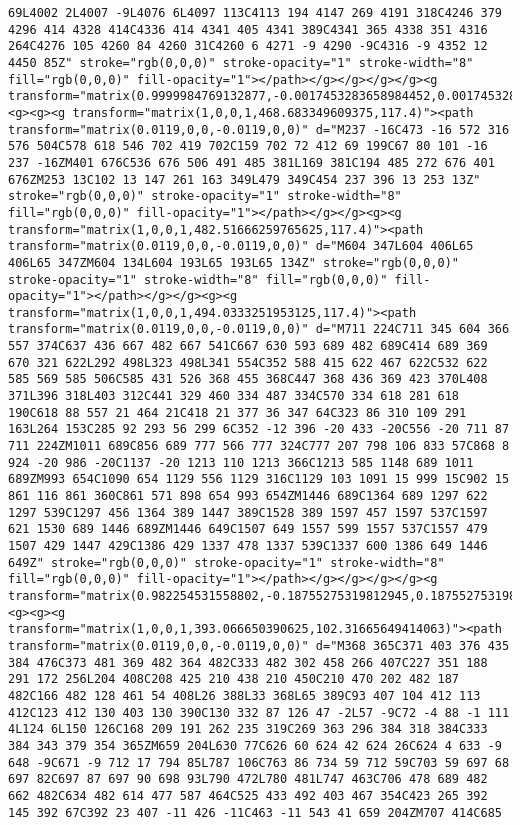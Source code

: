 \documentclass[
]{article}
\begin{document}
\begin{verbatim}
69L4002 2L4007 -9L4076 6L4097 113C4113 194 4147 269 4191 318C4246 379 4296 414 4328 414C4336 414 4341 405 4341 389C4341 365 4338 351 4316 264C4276 105 4260 84 4260 31C4260 6 4271 -9 4290 -9C4316 -9 4352 12 4450 85Z" stroke="rgb(0,0,0)" stroke-opacity="1" stroke-width="8" fill="rgb(0,0,0)" fill-opacity="1"></path></g></g></g></g><g transform="matrix(0.9999984769132877,-0.0017453283658984452,0.0017453283658984452,0.9999984769132877,-0.19616859080258564,0.8574044393116083)"><g><g><g transform="matrix(1,0,0,1,468.683349609375,117.4)"><path transform="matrix(0.0119,0,0,-0.0119,0,0)" d="M237 -16C473 -16 572 316 576 504C578 618 546 702 419 702C159 702 72 412 69 199C67 80 101 -16 237 -16ZM401 676C536 676 506 491 485 381L169 381C194 485 272 676 401 676ZM253 13C102 13 147 261 163 349L479 349C454 237 396 13 253 13Z" stroke="rgb(0,0,0)" stroke-opacity="1" stroke-width="8" fill="rgb(0,0,0)" fill-opacity="1"></path></g></g><g><g transform="matrix(1,0,0,1,482.51666259765625,117.4)"><path transform="matrix(0.0119,0,0,-0.0119,0,0)" d="M604 347L604 406L65 406L65 347ZM604 134L604 193L65 193L65 134Z" stroke="rgb(0,0,0)" stroke-opacity="1" stroke-width="8" fill="rgb(0,0,0)" fill-opacity="1"></path></g></g><g><g transform="matrix(1,0,0,1,494.0333251953125,117.4)"><path transform="matrix(0.0119,0,0,-0.0119,0,0)" d="M711 224C711 345 604 366 557 374C637 436 667 482 667 541C667 630 593 689 482 689C414 689 369 670 321 622L292 498L323 498L341 554C352 588 415 622 467 622C532 622 585 569 585 506C585 431 526 368 455 368C447 368 436 369 423 370L408 371L396 318L403 312C441 329 460 334 487 334C570 334 618 281 618 190C618 88 557 21 464 21C418 21 377 36 347 64C323 86 310 109 291 163L264 153C285 92 293 56 299 6C352 -12 396 -20 433 -20C556 -20 711 87 711 224ZM1011 689C856 689 777 566 777 324C777 207 798 106 833 57C868 8 924 -20 986 -20C1137 -20 1213 110 1213 366C1213 585 1148 689 1011 689ZM993 654C1090 654 1129 556 1129 316C1129 103 1091 15 999 15C902 15 861 116 861 360C861 571 898 654 993 654ZM1446 689C1364 689 1297 622 1297 539C1297 456 1364 389 1447 389C1528 389 1597 457 1597 537C1597 621 1530 689 1446 689ZM1446 649C1507 649 1557 599 1557 537C1557 479 1507 429 1447 429C1386 429 1337 478 1337 539C1337 600 1386 649 1446 649Z" stroke="rgb(0,0,0)" stroke-opacity="1" stroke-width="8" fill="rgb(0,0,0)" fill-opacity="1"></path></g></g></g></g><g transform="matrix(0.982254531558802,-0.18755275319812945,0.18755275319812945,0.982254531558802,-10.392640457751895,83.02631097363026)"><g><g><g transform="matrix(1,0,0,1,393.066650390625,102.31665649414063)"><path transform="matrix(0.0119,0,0,-0.0119,0,0)" d="M368 365C371 403 376 435 384 476C373 481 369 482 364 482C333 482 302 458 266 407C227 351 188 291 172 256L204 408C208 425 210 438 210 450C210 470 202 482 187 482C166 482 128 461 54 408L26 388L33 368L65 389C93 407 104 412 113 412C123 412 130 403 130 390C130 332 87 126 47 -2L57 -9C72 -4 88 -1 111 4L124 6L150 126C168 209 191 262 235 319C269 363 296 384 318 384C333 384 343 379 354 365ZM659 204L630 77C626 60 624 42 624 26C624 4 633 -9 648 -9C671 -9 712 17 794 85L787 106C763 86 734 59 712 59C703 59 697 68 697 82C697 87 697 90 698 93L790 472L780 481L747 463C706 478 689 482 662 482C634 482 614 477 587 464C525 433 492 403 467 354C423 265 392 145 392 67C392 23 407 -11 426 -11C463 -11 543 41 659 204ZM707 414C685 
\end{verbatim}
\end{document}
